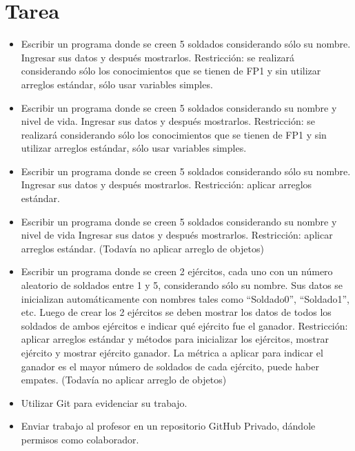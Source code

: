 \documentclass{article}
\begin{document}

	\section{Tarea}
	\begin{itemize}		
		\item Escribir un programa donde se creen 5 soldados considerando sólo su nombre. Ingresar sus datos y después mostrarlos. 
        Restricción: se realizará considerando sólo los conocimientos que se tienen de FP1 y sin utilizar arreglos estándar, sólo usar variables simples.
        \item Escribir un programa donde se creen 5 soldados considerando su nombre y nivel de vida. Ingresar sus datos y después mostrarlos.
        Restricción: se realizará considerando sólo los conocimientos que se tienen de FP1 y sin utilizar arreglos estándar, sólo usar variables simples.
        \item Escribir un programa donde se creen 5 soldados considerando sólo su nombre. Ingresar sus datos y después mostrarlos.
        Restricción: aplicar arreglos estándar.
        \item Escribir un programa donde se creen 5 soldados considerando su nombre y nivel de vida Ingresar sus datos y después mostrarlos.
        Restricción: aplicar arreglos estándar. (Todavía no aplicar arreglo de objetos)
        \item Escribir un programa donde se creen 2 ejércitos, cada uno con un número aleatorio de soldados entre 1 y 5, considerando sólo su nombre. Sus datos se inicializan automáticamente con nombres tales como “Soldado0”, “Soldado1”, etc. Luego de crear los 2 ejércitos se deben mostrar los datos de todos los soldados de ambos ejércitos e indicar qué ejército fue el ganador. Restricción: aplicar arreglos estándar y métodos para inicializar los ejércitos, mostrar ejército y mostrar ejército ganador. La métrica a aplicar para indicar el ganador es el mayor número de soldados de cada ejército, puede haber empates. (Todavía no aplicar arreglo de objetos)
		\item Utilizar Git para evidenciar su trabajo.
		\item Enviar trabajo al profesor en un repositorio GitHub Privado, dándole permisos como colaborador.
	\end{itemize}
		
\end{document}
